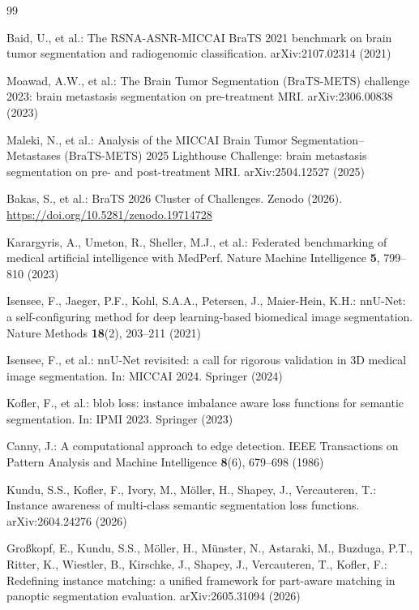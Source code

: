 \documentclass[runningheads]{llncs}
\begin{document}
\begin{thebibliography}{99}

Baid, U., et al.: The RSNA-ASNR-MICCAI BraTS 2021 benchmark on brain tumor segmentation and
radiogenomic classification. arXiv:2107.02314 (2021)

Moawad, A.W., et al.: The Brain Tumor Segmentation (BraTS-METS) challenge 2023: brain metastasis
segmentation on pre-treatment MRI. arXiv:2306.00838 (2023)

Maleki, N., et al.: Analysis of the MICCAI Brain Tumor Segmentation--Metastases (BraTS-METS) 2025
Lighthouse Challenge: brain metastasis segmentation on pre- and post-treatment MRI.
arXiv:2504.12527 (2025)

Bakas, S., et al.: BraTS 2026 Cluster of Challenges. Zenodo (2026).
\url{https://doi.org/10.5281/zenodo.19714728}

Karargyris, A., Umeton, R., Sheller, M.J., et al.: Federated benchmarking of medical artificial
intelligence with MedPerf. Nature Machine Intelligence \textbf{5}, 799--810 (2023)

Isensee, F., Jaeger, P.F., Kohl, S.A.A., Petersen, J., Maier-Hein, K.H.: nnU-Net: a
self-configuring method for deep learning-based biomedical image segmentation. Nature Methods
\textbf{18}(2), 203--211 (2021)

Isensee, F., et al.: nnU-Net revisited: a call for rigorous validation in 3D medical image
segmentation. In: MICCAI 2024. Springer (2024)

Kofler, F., et al.: blob loss: instance imbalance aware loss functions for semantic segmentation.
In: IPMI 2023. Springer (2023)

Canny, J.: A computational approach to edge detection. IEEE Transactions on Pattern Analysis and
Machine Intelligence \textbf{8}(6), 679--698 (1986)

Kundu, S.S., Kofler, F., Ivory, M., M\"oller, H., Shapey, J., Vercauteren, T.: Instance awareness
of multi-class semantic segmentation loss functions. arXiv:2604.24276 (2026)

Gro\ss{}kopf, E., Kundu, S.S., M\"oller, H., M\"unster, N., Astaraki, M., Buzduga, P.T., Ritter, K.,
Wiestler, B., Kirschke, J., Shapey, J., Vercauteren, T., Kofler, F.: Redefining instance matching:
a unified framework for part-aware matching in panoptic segmentation evaluation.
arXiv:2605.31094 (2026)


\end{thebibliography}
\end{document}
